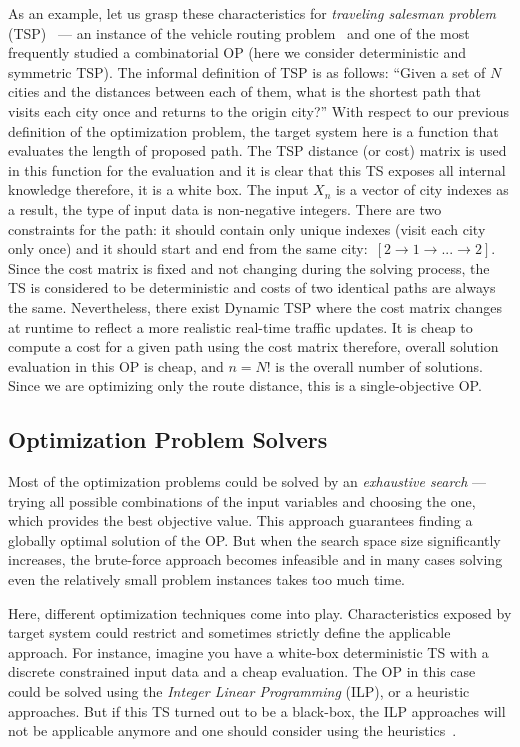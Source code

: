 As an example, let us grasp these characteristics for \emph{traveling salesman problem} (TSP)~\cite{applegate2006traveling} — an instance of the vehicle routing problem~\cite{laporte1992vehicle} and one of the most frequently studied a combinatorial OP (here we consider deterministic and symmetric TSP).
The informal definition of TSP is as follows: ``Given a set of $N$ cities and the distances between each of them, what is the shortest path that visits each city once and returns to the origin city?''
With respect to our previous definition of the optimization problem, the target system here is a function that evaluates the length of proposed path. The TSP distance (or cost) matrix is used in this function for the evaluation and it is clear that this TS exposes all internal knowledge therefore, it is a white box.
The input $X_n$ is a vector of city indexes as a result, the type of input data is non-negative integers. There are two constraints for the path: it should contain only unique indexes (visit each city only once) and it should start and end from the same city:~$[2 \rightarrow 1 \rightarrow ... \rightarrow 2]$.
Since the cost matrix is fixed and not changing during the solving process, the TS is considered to be deterministic and costs of two identical paths are always the same. Nevertheless, there exist Dynamic TSP where the cost matrix changes at runtime to reflect a more realistic real-time traffic updates\cite{cheong2011dynamic}.
It is cheap to compute a cost for a given path using the cost matrix therefore, overall solution evaluation in this OP is cheap, and $n = N!$ is the overall number of solutions. Since we are optimizing only the route distance, this is a single-objective OP.


\subsection{Optimization Problem Solvers}\label{BG: subsection OP Solvers}
Most of the optimization problems could be solved by an \emph{exhaustive search} — trying all possible combinations of the input variables and choosing the one, which provides the best objective value. This approach guarantees finding a globally optimal solution of the OP. But when the search space size significantly increases, the brute-force approach becomes infeasible and in many cases solving even the relatively small problem instances takes too much time.

Here, different optimization techniques come into play. Characteristics exposed by target system could restrict and sometimes strictly define the applicable approach.
For instance, imagine you have a white-box deterministic TS with a discrete constrained input data and a cheap evaluation. The OP in this case could be solved using the \emph{Integer Linear Programming} (ILP), or a heuristic approaches. But if this TS turned out to be a black-box, the ILP approaches will not be applicable anymore and one should consider using the heuristics~\cite{biegler2004retrospective}.

